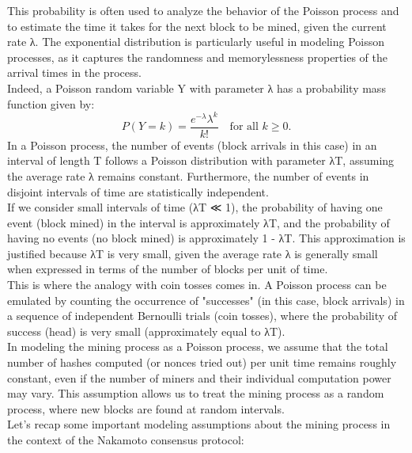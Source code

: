 \documentclass{report}
\begin{document}
This probability is often used to analyze the behavior of the Poisson process and to estimate the time it takes for the next block to be mined, given the current rate λ. The exponential distribution is particularly useful in modeling Poisson processes, as it captures the randomness and memorylessness properties of the arrival times in the process.\\
Indeed, a Poisson random variable Y with parameter λ has a probability mass function given by:
$$P(Y = k) = \frac{e^{-\lambda} \lambda^k}{k!} \quad \text{for all } k \geq 0.$$
In a Poisson process, the number of events (block arrivals in this case) in an interval of length T follows a Poisson distribution with parameter λT, assuming the average rate λ remains constant. Furthermore, the number of events in disjoint intervals of time are statistically independent.\\
If we consider small intervals of time (λT ≪ 1), the probability of having one event (block mined) in the interval is approximately λT, and the probability of having no events (no block mined) is approximately 1 - λT. This approximation is justified because λT is very small, given the average rate λ is generally small when expressed in terms of the number of blocks per unit of time.\\
This is where the analogy with coin tosses comes in. A Poisson process can be emulated by counting the occurrence of "successes" (in this case, block arrivals) in a sequence of independent Bernoulli trials (coin tosses), where the probability of success (head) is very small (approximately equal to λT).\\
In modeling the mining process as a Poisson process, we assume that the total number of hashes computed (or nonces tried out) per unit time remains roughly constant, even if the number of miners and their individual computation power may vary. This assumption allows us to treat the mining process as a random process, where new blocks are found at random intervals.\\
Let's recap some important modeling assumptions about the mining process in the context of the Nakamoto consensus protocol:\\
\end{document}
